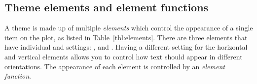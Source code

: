 % 
% 
% 
% 


\subsection{Theme elements and element functions}
\label{sec:theme_elements}

A theme is made up of multiple \emph{elements} which control the appearance of a single item on the plot, as listed in Table~\ref{tbl:elements}. There are three elements that have individual  and  settings: ,  and . Having a different setting for the horizontal and vertical elements allows you to control how text should appear in different orientations. The appearance of each element is controlled by an \emph{element function}.

